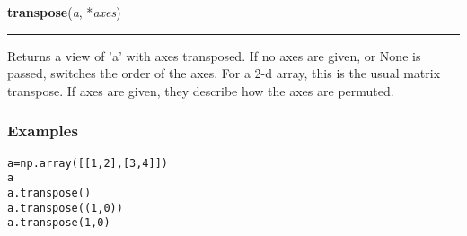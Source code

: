     \begin{boxedminipage}{\textwidth}

    \raggedright \textbf{transpose}(\textit{a}, *\textit{axes})

    \vspace{-1.5ex}

    \rule{\textwidth}{0.5\fboxrule}

Returns a view of 'a' with axes transposed. If no axes are given,
or None is passed, switches the order of the axes. For a 2-d
array, this is the usual matrix transpose. If axes are given,
they describe how the axes are permuted.



\hypertarget{examples}{}
\subsubsection*{Examples}
\begin{alltt}
\pysrcprompt{{\textgreater}{\textgreater}{\textgreater} }a = np.array([[1,2],[3,4]])
\pysrcprompt{{\textgreater}{\textgreater}{\textgreater} }a
\pysrcoutput{array([[1, 2],}
\pysrcoutput{       [3, 4]])}
\pysrcoutput{}\pysrcprompt{{\textgreater}{\textgreater}{\textgreater} }a.transpose()
\pysrcoutput{array([[1, 3],}
\pysrcoutput{       [2, 4]])}
\pysrcoutput{}\pysrcprompt{{\textgreater}{\textgreater}{\textgreater} }a.transpose((1,0))
\pysrcoutput{array([[1, 3],}
\pysrcoutput{       [2, 4]])}
\pysrcoutput{}\pysrcprompt{{\textgreater}{\textgreater}{\textgreater} }a.transpose(1,0)
\pysrcoutput{array([[1, 3],}
\pysrcoutput{       [2, 4]])}\end{alltt}
    \vspace{1ex}

    \end{boxedminipage}

    \label{numpy:ndarray:var}

    \vspace{0.5ex}

